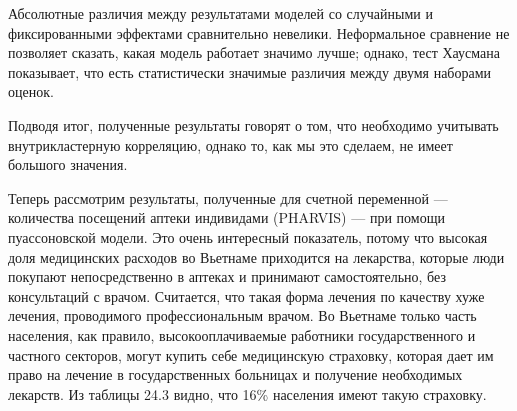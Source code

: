 Абсолютные различия между результатами  моделей со случайными и фиксированными эффектами сравнительно невелики. Неформальное сравнение не позволяет сказать, какая модель работает значимо лучше; однако, тест Хаусмана показывает, что есть статистически значимые различия между двумя наборами оценок. 

Подводя итог, полученные результаты говорят о том, что необходимо учитывать внутрикластерную корреляцию, однако то, как мы это сделаем, не имеет большого значения. 

Теперь рассмотрим результаты, полученные для счетной переменной --- количества посещений аптеки индивидами (PHARVIS) --- при помощи пуассоновской модели. Это очень интересный показатель, потому что высокая доля медицинских расходов во Вьетнаме приходится на лекарства, которые люди покупают непосредственно в аптеках и принимают самостоятельно, без консультаций с врачом. Считается, что такая форма лечения по качеству хуже лечения, проводимого профессиональным врачом. Во Вьетнаме только часть населения, как правило, высокооплачиваемые работники государственного и частного секторов, могут купить себе медицинскую страховку, которая дает им право на лечение в государственных больницах и получение необходимых лекарств. Из таблицы 24.3 видно, что 16\% населения имеют такую страховку. 



